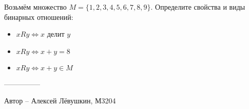 \question
Возьмём множество $M = \{1, 2, 3, 4, 5, 6, 7, 8, 9\}$. Определите свойства и виды бинарных отношений:
\begin{itemize}
    \item $xRy \Leftrightarrow x$ делит $y$
    \item $xRy \Leftrightarrow x + y = 8$
    \item $xRy \Leftrightarrow x + y \in M$
\end{itemize}
---------------

Автор -- Алексей Лёвушкин, М3204